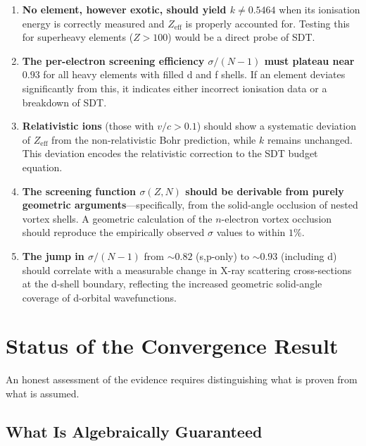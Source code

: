 \begin{enumerate}
  \item \textbf{No element, however exotic, should yield $k \neq 0.5464$} when its ionisation energy is correctly measured and $Z_{\text{eff}}$ is properly accounted for.  Testing this for superheavy elements ($Z > 100$) would be a direct probe of SDT.

  \item \textbf{The per-electron screening efficiency $\sigma/(N{-}1)$ must plateau near $0.93$} for all heavy elements with filled d and f shells.  If an element deviates significantly from this, it indicates either incorrect ionisation data or a breakdown of SDT.

  \item \textbf{Relativistic ions} (those with $v/c > 0.1$) should show a systematic deviation of $Z_{\text{eff}}$ from the non-relativistic Bohr prediction, while $k$ remains unchanged.  This deviation encodes the relativistic correction to the SDT budget equation.

  \item \textbf{The screening function $\sigma(Z, N)$ should be derivable from purely geometric arguments}---specifically, from the solid-angle occlusion of nested vortex shells.  A geometric calculation of the $n$-electron vortex occlusion should reproduce the empirically observed $\sigma$ values to within $1\%$.

  \item \textbf{The jump in $\sigma/(N{-}1)$} from $\sim 0.82$ (s,p-only) to $\sim 0.93$ (including d) should correlate with a measurable change in X-ray scattering cross-sections at the d-shell boundary, reflecting the increased geometric solid-angle coverage of d-orbital wavefunctions.
\end{enumerate}


\section{Status of the Convergence Result}
\label{sec:disclosure}

An honest assessment of the evidence requires distinguishing what is proven from what is assumed.

\subsection{What Is Algebraically Guaranteed}

